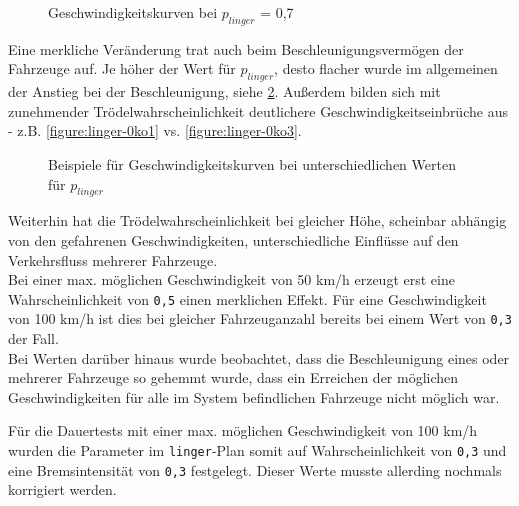 \begin{figure}[hptb]
  \centering 
   \qquad
   \qquad
  \caption{Geschwindigkeitskurven bei $p_{linger}$ = 0,7}
  \label{figure:linger-0ko7}
\end{figure}

Eine merkliche Veränderung trat auch beim Beschleunigungsvermögen der Fahrzeuge auf.
Je höher der Wert für $ p_{linger} $, desto flacher wurde im allgemeinen der Anstieg bei der Beschleunigung, siehe \cref{figure:linger-0ko1-3-5}.
Außerdem bilden sich mit zunehmender Trödelwahrscheinlichkeit deutlichere Geschwindigkeitseinbrüche aus - z.B. \cref{figure:linger-0ko1} vs. \cref{figure:linger-0ko3}.

\begin{figure}[hptb]
  \centering 
   \qquad
   \qquad
  \caption{Beispiele für Geschwindigkeitskurven bei unterschiedlichen Werten für $p_{linger}$}
  \label{figure:linger-0ko1-3-5}
\end{figure}

Weiterhin hat die Trödelwahrscheinlichkeit bei gleicher Höhe, scheinbar abhängig von den gefahrenen Geschwindigkeiten, unterschiedliche Einflüsse auf den Verkehrsfluss mehrerer Fahrzeuge.
\\
Bei einer max. möglichen Geschwindigkeit von 50 km/h erzeugt erst eine Wahrscheinlichkeit von \texttt{0,5} einen merklichen Effekt. Für eine Geschwindigkeit von 100 km/h ist dies bei gleicher Fahrzeuganzahl bereits bei einem Wert von \texttt{0,3} der Fall.
\\
Bei Werten darüber hinaus wurde beobachtet, dass die Beschleunigung eines oder mehrerer Fahrzeuge so gehemmt wurde, dass ein Erreichen der möglichen Geschwindigkeiten für alle im System befindlichen Fahrzeuge nicht möglich war.

Für die Dauertests mit einer max. möglichen Geschwindigkeit von 100 km/h wurden die Parameter im \texttt{linger}-Plan somit auf Wahrscheinlichkeit von \texttt{0,3} und eine Bremsintensität von \texttt{0,3} festgelegt.
Dieser Werte musste allerding nochmals korrigiert werden.





